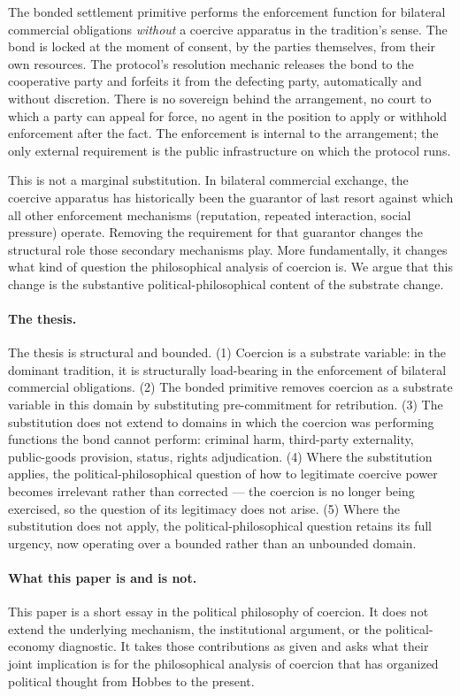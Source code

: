 \documentclass[11pt,a4paper]{article}
\theoremstyle{remark}
\begin{document}
The bonded settlement primitive performs the enforcement
function for bilateral commercial obligations \emph{without} a
coercive apparatus in the tradition's sense. The bond is locked at the
moment of consent, by the parties themselves, from their own
resources. The protocol's resolution mechanic releases the bond
to the cooperative party and forfeits it from the defecting
party, automatically and without discretion. There is no
sovereign behind the arrangement, no court to which a party can
appeal for force, no agent in the position to apply or withhold
enforcement after the fact. The enforcement is internal to the
arrangement; the only external requirement is the public
infrastructure on which the protocol runs.

This is not a marginal substitution. In bilateral commercial
exchange, the coercive apparatus has historically been the
guarantor of last resort against which all other enforcement
mechanisms (reputation, repeated interaction, social pressure)
operate. Removing the requirement for that guarantor changes the
structural role those secondary mechanisms play. More
fundamentally, it changes what kind of question the philosophical
analysis of coercion is. We argue that this change is the
substantive political-philosophical content of the substrate
change.

\paragraph{The thesis.}
The thesis is structural and bounded. (1) Coercion is a substrate
variable: in the dominant tradition, it is structurally
load-bearing in the enforcement of bilateral commercial
obligations. (2) The bonded primitive removes coercion as a
substrate variable in this domain by substituting pre-commitment
for retribution. (3) The substitution does not extend to domains
in which the coercion was performing functions the bond cannot
perform: criminal harm, third-party externality, public-goods
provision, status, rights adjudication. (4) Where the
substitution applies, the political-philosophical question of
how to legitimate coercive power becomes irrelevant rather than
corrected --- the coercion is no longer being exercised, so the
question of its legitimacy does not arise. (5) Where the
substitution does not apply, the political-philosophical question
retains its full urgency, now operating over a bounded rather
than an unbounded domain.

\paragraph{What this paper is and is not.}
This paper is a short essay in the political philosophy of
coercion. It does not extend the underlying mechanism, the
institutional argument, or the political-economy diagnostic. It
takes those contributions as given and asks what their joint
implication is for the philosophical analysis of coercion that
has organized political thought from Hobbes to the present.
\end{document}
